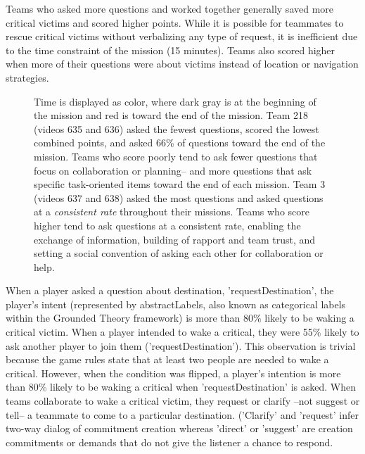 Teams who asked more questions and worked together generally saved more critical victims and scored higher points. While it is possible for teammates to rescue critical victims without verbalizing any type of request, it is inefficient due to the time constraint of the mission (15 minutes). Teams also scored higher when more of their questions were about victims instead of location or navigation strategies. 
\begin{figure}[h!]
    \centering
    \caption{Time is displayed as color, where dark gray is at the beginning of the mission and red is toward the end of the mission. Team 218 (videos 635 and 636) asked the
fewest questions, scored the lowest combined points, and asked 66\%
of questions toward the end of the mission. Teams who score poorly tend to ask fewer questions that focus on collaboration or planning-- and more questions that ask specific task-oriented items toward the end of each mission. Team 3 (videos 637 and 638) asked the most questions and asked questions at a \emph{consistent rate} throughout their missions. Teams who score higher tend to ask questions at a consistent rate, enabling the exchange of information, building of rapport and team trust, and setting a social convention of asking each other for collaboration or help. }
\end{figure}

When a player asked a question about destination, 'requestDestination', the player's intent (represented by abstractLabels, also known as categorical labels within the Grounded Theory framework) is more than 80\% likely to be waking a critical victim. When a player intended to wake a critical, they were 55\% likely to ask another player to join them ('requestDestination'). This observation is trivial because the game rules state that at least two people are needed to wake a critical. However, when the condition was flipped, a player's intention is more than 80\% likely to be waking a critical when 'requestDestination' is asked. When teams collaborate to wake a critical victim, they request or clarify --not suggest or tell-- a teammate to come to a particular destination. ('Clarify' and 'request' infer two-way dialog of commitment creation whereas 'direct' or 'suggest' are creation commitments or demands that do not give the listener a chance to respond.


